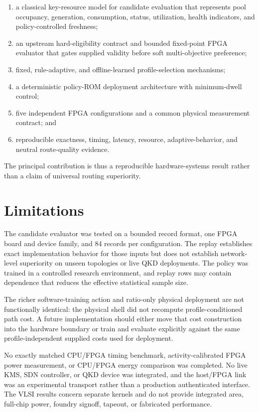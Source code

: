 \begin{enumerate}
  \item a classical key-resource model for candidate evaluation that represents
  pool occupancy, generation, consumption, status, utilization, health indicators,
  and policy-controlled freshness;
  \item an upstream hard-eligibility contract and bounded fixed-point FPGA evaluator
  that gates supplied validity before soft multi-objective preference;
  \item fixed, rule-adaptive, and offline-learned profile-selection mechanisms;
  \item a deterministic policy-ROM deployment architecture with minimum-dwell
  control;
  \item five independent FPGA configurations and a common physical measurement
  contract; and
  \item reproducible exactness, timing, latency, resource, adaptive-behavior, and
  neutral route-quality evidence.
\end{enumerate}

The principal contribution is thus a reproducible hardware-systems result rather
than a claim of universal routing superiority.

\section{Limitations}

The candidate evaluator was tested on a bounded record format, one FPGA board and
device family, and 84 records per configuration. The replay establishes exact
implementation behavior for those inputs but does not establish network-level
superiority on unseen topologies or live QKD deployments. The policy was trained in
a controlled research environment, and replay rows may contain dependence that
reduces the effective statistical sample size.

The richer software-training action and ratio-only physical deployment are not
functionally identical: the physical shell did not recompute profile-conditioned
path cost. A future implementation should either move that cost construction into
the hardware boundary or train and evaluate explicitly against the same
profile-independent supplied costs used for deployment.

No exactly matched CPU/FPGA timing benchmark, activity-calibrated FPGA power
measurement, or CPU/FPGA energy comparison was completed. No live KMS, SDN
controller, or QKD device was integrated, and the host/FPGA link was an experimental
transport rather than a production authenticated interface. The VLSI results concern
separate kernels and do not provide integrated area, full-chip power, foundry
signoff, tapeout, or fabricated performance.

